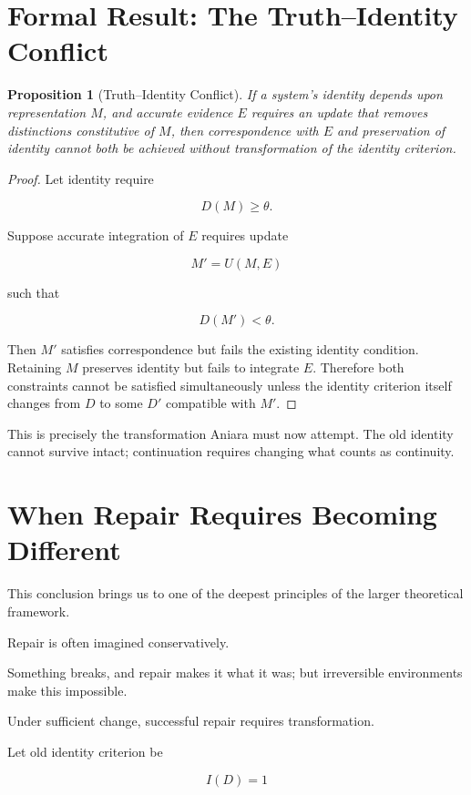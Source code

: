 \documentclass[11pt,oneside]{book}
\newtheorem{proposition}[theorem]{Proposition}
\theoremstyle{definition}
\theoremstyle{remark}
\begin{document}
\section{Formal Result: The Truth--Identity Conflict}

\begin{proposition}[Truth--Identity Conflict]
If a system's identity depends upon representation \(M\), and accurate evidence \(E\) requires an update that removes distinctions constitutive of \(M\), then correspondence with \(E\) and preservation of identity cannot both be achieved without transformation of the identity criterion.
\end{proposition}

\begin{proof}
Let identity require

\[
D(M)\geq\theta.
\]

Suppose accurate integration of \(E\) requires update

\[
M'=U(M,E)
\]

such that

\[
D(M')<\theta.
\]

Then \(M'\) satisfies correspondence but fails the existing identity condition. Retaining \(M\) preserves identity but fails to integrate \(E\). Therefore both constraints cannot be satisfied simultaneously unless the identity criterion itself changes from \(D\) to some \(D'\) compatible with \(M'\).
\end{proof}

This is precisely the transformation Aniara must now attempt. The old identity cannot survive intact; continuation requires changing what counts as continuity.

\section{When Repair Requires Becoming Different}

This conclusion brings us to one of the deepest principles of the larger theoretical framework.

Repair is often imagined conservatively.

Something breaks, and repair makes it what it was; but irreversible environments make this impossible.

Under sufficient change, successful repair requires transformation.

Let old identity criterion be

\[
I(D)=1
\]
\end{document}
